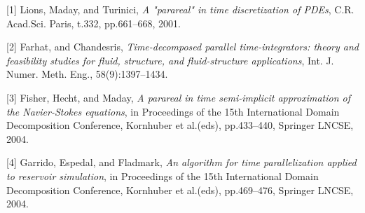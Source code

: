 \documentclass{report}
\begin{document}
[1] Lions, Maday, and Turinici,
{\em A "parareal" in time discretization of
PDEs}, C.R. Acad.Sci. Paris, t.332, pp.661--668, 2001.

[2] Farhat, and Chandesris,
{\em Time-decomposed parallel time-integrators:
theory and feasibility studies for fluid, structure, and
fluid-structure applications}, Int. J. Numer. Meth. Eng.,
58(9):1397--1434.

[3] Fisher, Hecht, and Maday,
{\em A parareal in time semi-implicit
approximation of the Navier-Stokes equations}, in Proceedings of the
15th International Domain Decomposition Conference, Kornhuber et
al.(eds), pp.433--440, Springer LNCSE, 2004.

[4] Garrido, Espedal, and Fladmark,
{\em An algorithm for time
parallelization applied to reservoir simulation}, in Proceedings of the
15th International Domain Decomposition Conference, Kornhuber et
al.(eds), pp.469--476, Springer LNCSE, 2004.
\end{document}

